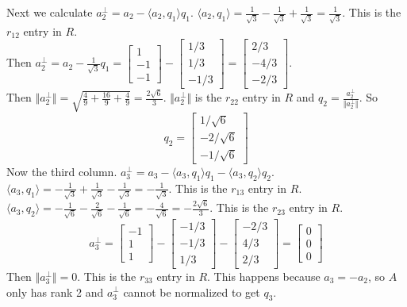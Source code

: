 \documentclass[11pt]{article}
\begin{document}
\noindent Next we calculate $a_2^{\perp}=a_2-\langle a_2,q_1\rangle q_1$. \quad $\langle a_2,q_1\rangle=\frac{1}{\sqrt3}-\frac{1}{\sqrt3}+\frac{1}{\sqrt3} = \frac{1}{\sqrt3}$. This is the $r_{12}$ entry in $R$.\\
Then $a_2^{\perp} = a_2-\frac{1}{\sqrt3}q_1=\begin{bmatrix}
    1\\-1\\-1
\end{bmatrix}-\begin{bmatrix}
    1/3\\1/3\\-1/3
\end{bmatrix}= \begin{bmatrix}
    2/3\\-4/3\\-2/3
\end{bmatrix}$.\\
Then $\Vert a_2^{\perp} \Vert = \sqrt{\frac49+\frac{16}{9}+\frac49} = \frac{2\sqrt6}{3}$. $\Vert a_2^{\perp} \Vert$ is the $r_{22}$ entry in $R$
and $q_2 = \frac{a_2^{\perp}}{\Vert a_2^{\perp} \Vert}$. So
$$
q_2 = \begin{bmatrix}
    1/\sqrt6\\-2/\sqrt6\\-1/\sqrt6
\end{bmatrix}
$$
\bigskip
Now the third column. $a_3^{\perp} = a_3-\langle a_3,q_1\rangle q_1-\langle a_3,q_2\rangle q_2$.\\
$\langle a_3,q_1\rangle = -\frac{1}{\sqrt3}+\frac{1}{\sqrt3}-\frac{1}{\sqrt3}= -\frac{1}{\sqrt3}$. This is the $r_{13}$ entry in $R$.\\
$\langle a_3,q_2\rangle = -\frac{1}{\sqrt6}-\frac{2}{\sqrt6}-\frac{1}{\sqrt6} = -\frac{4}{\sqrt6} = -\frac{2\sqrt6}{3}$. This is the $r_{23}$ entry in $R$.
$$
a_3^{\perp}=\begin{bmatrix}
    -1\\1\\1
\end{bmatrix}-\begin{bmatrix}
    -1/3\\-1/3\\1/3
\end{bmatrix}-\begin{bmatrix}
    -2/3\\4/3\\2/3
\end{bmatrix}=\begin{bmatrix}
    0\\0\\0
\end{bmatrix}
$$
Then $\Vert a_3^{\perp} \Vert = 0$. This is the $r_{33}$ entry in $R$. This happens because $a_3 = -a_2$, so $A$ only has rank 2 and $a_3^{\perp}$ cannot be normalized to get $q_3$.\\
\medskip
\end{document}

